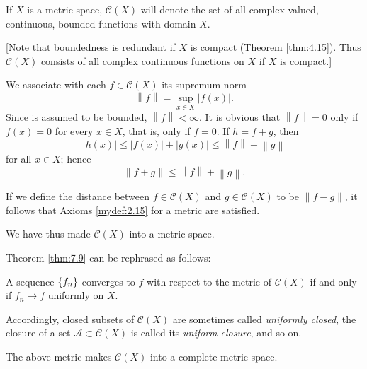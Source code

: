 \begin{mydef}
    \label{mydef:7.14}
    If $X$ is a metric space, $\mathscr{C}(X)$ will denote the set of all complex-valued, continuous, bounded functions with domain $X$.

    [Note that boundedness is redundant if $X$ is compact (Theorem \ref{thm:4.15}). 
    Thus $\mathscr{C}(X)$ consists of all complex continuous functions on $X$ if $X$ is compact.]

    We associate with each $f \in \mathscr{C}(X)$ its supremum norm
    \begin{equation*}
        \left\| f \right\| = \sup_{x \in X} \left| f(x) \right| .
    \end{equation*}
    Since 
    is assumed to be bounded, $\left\| f \right\| < \infty $. 
    It is obvious that $\left\| f \right\| = 0$ only if
    $f(x) = 0$ for every $x \in X$, 
    that is, only if $f = 0$. 
    If $h =f + g$, then
    \begin{equation*}
        \left| h(x) \right| \leq 
        \left| f(x) \right| + \left| g(x) \right| \leq
        \left\| f \right\| + \left\| g \right\| 
    \end{equation*}
    for all $x \in X$; hence
    \begin{equation*}
        \left\| f + g \right\| \leq
        \left\| f \right\| + \left\| g \right\| .
    \end{equation*}

    If we define the distance between $f \in \mathscr{C}(X)$ and $g \in \mathscr{C}(X)$ to be $\left\| f - g \right\| $,
    it follows that Axioms \ref{mydef:2.15} for a metric are satisfied.

    We have thus made $\mathscr{C}(X)$ into a metric space.
    
    Theorem \ref{thm:7.9} can be rephrased as follows:
    
    A sequence $\protect\{f_n\}$ converges to $f$ with respect to the metric of $\mathscr{C}(X)$ if and only if $f_n \rightarrow f$ uniformly on $X$.
    
    Accordingly, closed subsets of $\mathscr{C}(X)$ are sometimes called \emph{uniformly closed}, 
    the closure of a set $\mathscr{A} \subset \mathscr{C}(X)$ is called its \emph{uniform closure}, and so on.
\end{mydef}

\begin{thm}
    \label{thm:7.15}
    The above metric makes $\mathscr{C}(X)$ into a complete metric space.
\end{thm}



